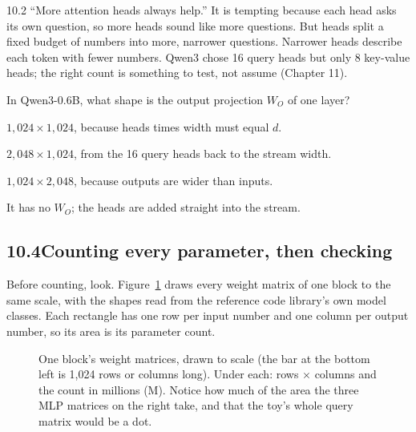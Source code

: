 \begin{wrongidea}{10.2}
``More attention heads always help.'' It is tempting because each head asks its own question, so more heads
sound like more questions. But heads split a
fixed budget of numbers into more, narrower questions. Narrower heads describe each token with fewer numbers.
Qwen3 chose 16 query heads but only 8 key-value heads; the right count is something to test, not assume
(Chapter 11).
\end{wrongidea}

\begin{checkq}
In Qwen3-0.6B, what shape is the output projection $W_O$ of one layer?
\begin{options}
\item $1{,}024\times1{,}024$, because heads times width must equal $d$.
\item $2{,}048\times1{,}024$, from the 16 query heads back to the stream width.
\item $1{,}024\times2{,}048$, because outputs are wider than inputs.
\item It has no $W_O$; the heads are added straight into the stream.
\end{options}
\end{checkq}


\subsection*{10.4\quad Counting every parameter, then checking}

Before counting, look. Figure~\ref{fig:ch10scale} draws every weight matrix of one block to the same scale,
with the shapes read from the reference code library's own model classes. Each rectangle has one row per input
number and one column per output number, so its area is its parameter count.

\begin{figure}[!htb]
\centering

\caption{One block's weight matrices, drawn to scale (the bar at the bottom left is 1{,}024 rows or columns long). Under each: rows
$\times$ columns and the count in millions (M). Notice how much of the area the three MLP matrices on the right
take, and that the toy's whole query matrix would be a dot.}
\label{fig:ch10scale}
\end{figure}

